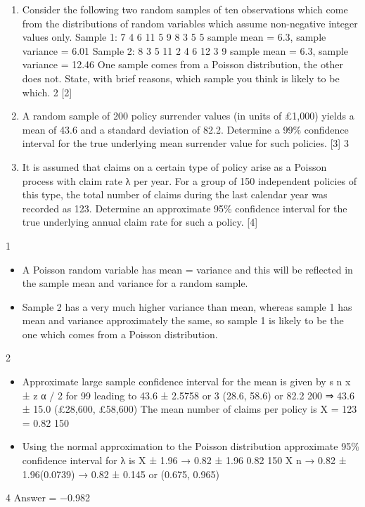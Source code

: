 \documentclass[a4paper,12pt]{article}
\begin{document}
\begin{enumerate}

\item Consider the following two random samples of ten observations which come from the
distributions of random variables which assume non-negative integer values only.
Sample 1: 7 4 6 11 5 9 8 3 5 5
sample mean = 6.3, sample variance = 6.01
Sample 2: 8 3 5 11 2 4 6 12 3 9
sample mean = 6.3, sample variance = 12.46
One sample comes from a Poisson distribution, the other does not.
State, with brief reasons, which sample you think is likely to be which.
2
[2]
\item A random sample of 200 policy surrender values (in units of £1,000) yields a mean of
43.6 and a standard deviation of 82.2.
Determine a 99\% confidence interval for the true underlying mean surrender value for
such policies.
[3]
3
\item It is assumed that claims on a certain type of policy arise as a Poisson process with
claim rate λ per year.
For a group of 150 independent policies of this type, the total number of claims during
the last calendar year was recorded as 123.
Determine an approximate 95\% confidence interval for the true underlying annual
claim rate for such a policy.
[4]
\end{enumerate}
\newpage
1
\begin{itemize}
    \item A Poisson random variable has mean = variance and this will be reflected in the
sample mean and variance for a random sample.
\item Sample 2 has a very much higher variance than mean, whereas sample 1 has mean
and variance approximately the same, so sample 1 is likely to be the one which comes
from a Poisson distribution.
\end{itemize}

2
\begin{itemize}
\item Approximate large sample confidence interval for the mean is given by
s
n
x ± z α / 2
for 99%
leading to 43.6 ± 2.5758
or
3
(28.6, 58.6)
or
82.2
200
⇒ 43.6 ± 15.0
(£28,600, £58,600)
\itme The mean number of claims per policy is X =
123
= 0.82
150
\item Using the normal approximation to the Poisson distribution approximate 95\% confidence interval for λ is X ± 1.96
→ 0.82 ± 1.96
0.82
150
X
n
→ 0.82 ± 1.96(0.0739)
→ 0.82 ± 0.145 or (0.675, 0.965)
\end{itemize}
4
Answer = −0.982
\end{document}
